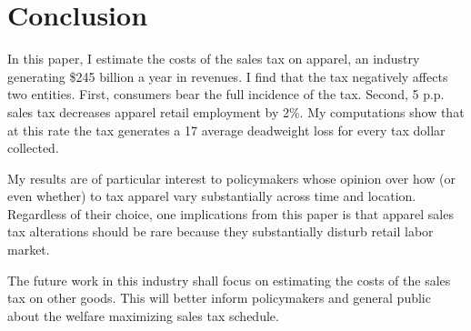 \documentclass[12pt]{article}
\begin{document}
		
	


\section{Conclusion}
In this paper, I estimate the costs of the sales tax on apparel, an industry generating \$245 billion a year in revenues. I find that the tax negatively affects two entities. First, consumers bear the full incidence of the tax. Second, 5 p.p. sales tax decreases apparel retail employment by  2\%. My computations show that at this rate the tax generates a 17\textcentoldstyle{} average deadweight loss for every tax dollar collected. 

My results are of particular interest to policymakers whose opinion over how (or even whether) to tax apparel vary substantially across time and location. Regardless of their choice, one implications from this paper is that apparel sales tax alterations should be rare because they  substantially disturb retail labor market. 

The future work in this industry shall focus on estimating the costs of the sales tax on other goods. This will better inform policymakers and general public about the welfare maximizing sales tax schedule. 

\end{document}
